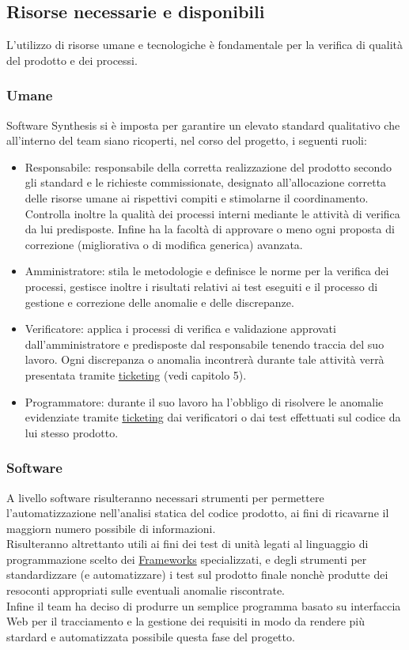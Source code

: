 \subsection{Risorse necessarie e disponibili}
L'utilizzo di risorse umane e tecnologiche è fondamentale per la verifica di qualità del prodotto e dei processi. 
\subsubsection{Umane}
Software Synthesis si è imposta per garantire un elevato standard qualitativo che all'interno del team siano ricoperti, nel corso del progetto, i seguenti ruoli:
\begin{itemize}
\item Responsabile: responsabile della corretta realizzazione del prodotto secondo gli standard e le richieste commissionate, designato all'allocazione corretta delle risorse umane ai rispettivi compiti e stimolarne il coordinamento. 
Controlla inoltre la qualità dei processi interni mediante le attività di verifica da lui predisposte. Infine ha la facoltà di approvare o meno ogni proposta di correzione (migliorativa o di modifica generica) avanzata.
\item Amministratore: stila le metodologie e definisce le norme per la verifica dei processi, gestisce inoltre i risultati relativi ai test eseguiti e il processo di gestione e correzione delle anomalie e delle discrepanze.
\item Verificatore: applica i processi di verifica e validazione approvati dall'amministratore e predisposte dal responsabile tenendo traccia del suo lavoro. Ogni discrepanza o anomalia incontrerà durante tale attività verrà presentata tramite \underline{ticketing} (vedi capitolo 5).
\item Programmatore: durante il suo lavoro ha l'obbligo di risolvere le anomalie evidenziate tramite \underline{ticketing} dai verificatori o dai test effettuati sul codice da lui stesso prodotto.
\end{itemize}
\subsubsection{Software}
A livello software risulteranno necessari strumenti per permettere l'automatizzazione nell'analisi statica del codice prodotto, ai fini di ricavarne il maggiorn numero possibile di informazioni.\\
Risulteranno altrettanto utili ai fini dei test di unità legati al linguaggio di programmazione scelto dei \underline{Frameworks} specializzati, e degli strumenti per standardizzare (e automatizzare) i test sul prodotto finale nonchè produtte dei resoconti appropriati sulle eventuali anomalie riscontrate.\\
Infine il team ha deciso di produrre un semplice programma basato su interfaccia Web per il tracciamento e la gestione dei requisiti in modo da rendere più stardard e automatizzata possibile questa fase del progetto.
